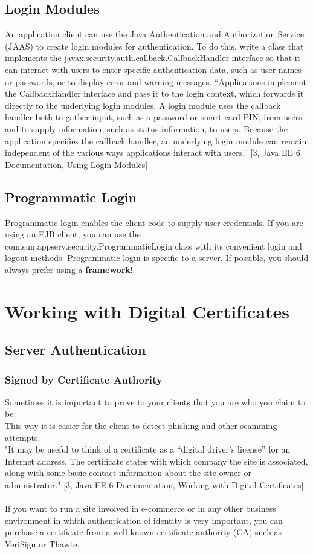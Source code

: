 \documentclass[12pt,a4paper]{report}
\begin{document}
\section{Login Modules}
An application client can use the Java Authentication and Authorization Service (JAAS) to create login modules for authentication.
To do this, write a class that implements the javax.security.auth.callback.CallbackHandler interface so that it can interact with users to enter specific authentication data, such as user names or passwords, or to display error and warning messages.
“Applications implement the CallbackHandler interface and pass it to the login context, which forwards it directly to the underlying login modules. A login module uses the callback handler both to gather input, such as a password or smart card PIN, from users and to supply information, such as status information, to users. Because the application specifies the callback handler, an underlying login module can remain independent of the various ways applications interact with users.” [3, Java EE 6 Documentation, Using Login Modules]

\section{Programmatic Login}
Programmatic login enables the client code to supply user credentials. If you are using an EJB client, you can use the com.sun.appserv.security.ProgrammaticLogin class with its convenient login and logout methods. Programmatic login is specific to a server. If possible, you should always prefer using a \textbf{framework}!


\chapter{Working with Digital Certificates}
\section{Server Authentication}
\subsection{Signed by Certificate Authority}
Sometimes it is important to prove to your clients that you are who you claim to be.\\
This way it is easier for the client to detect phishing and other scamming attempts.\\

"It may be useful to think of a certificate as a “digital driver’s license” for an Internet address. The certificate states with which company the site is associated, along with some basic contact information about the site owner or administrator." [3, Java EE 6 Documentation, Working with Digital Certificates]\\\\
If you want to run a site involved in e-commerce or in any other business environment in which authentication of identity is very important, you can purchase a certificate from a well-known certificate authority (CA) such as VeriSign or Thawte.
\end{document}
